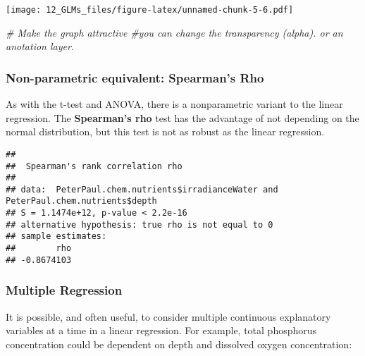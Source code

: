 \documentclass[]{article}
\newenvironment{Shaded}{\begin{snugshade}}{\end{snugshade}}
\newcommand{\KeywordTok}[1]{\textcolor[rgb]{0.13,0.29,0.53}{\textbf{#1}}}
\newcommand{\DataTypeTok}[1]{\textcolor[rgb]{0.13,0.29,0.53}{#1}}
\newcommand{\StringTok}[1]{\textcolor[rgb]{0.31,0.60,0.02}{#1}}
\newcommand{\CommentTok}[1]{\textcolor[rgb]{0.56,0.35,0.01}{\textit{#1}}}
\newcommand{\OtherTok}[1]{\textcolor[rgb]{0.56,0.35,0.01}{#1}}
\newcommand{\OperatorTok}[1]{\textcolor[rgb]{0.81,0.36,0.00}{\textbf{#1}}}
\newcommand{\NormalTok}[1]{#1}
\begin{document}
\texttt{[image: 12\_GLMs\_files/figure-latex/unnamed-chunk-5-6.pdf]}

\begin{Shaded}
\begin{Highlighting}[]
\CommentTok{# Make the graph attractive}
\CommentTok{#you can change the transparency (alpha). or an anotation layer.}
\end{Highlighting}
\end{Shaded}

\subsubsection{Non-parametric equivalent: Spearman's
Rho}\label{non-parametric-equivalent-spearmans-rho}

As with the t-test and ANOVA, there is a nonparametric variant to the
linear regression. The \textbf{Spearman's rho} test has the advantage of
not depending on the normal distribution, but this test is not as robust
as the linear regression.

\begin{Shaded}
\end{Shaded}

\begin{verbatim}
## 
##  Spearman's rank correlation rho
## 
## data:  PeterPaul.chem.nutrients$irradianceWater and PeterPaul.chem.nutrients$depth
## S = 1.1474e+12, p-value < 2.2e-16
## alternative hypothesis: true rho is not equal to 0
## sample estimates:
##        rho 
## -0.8674103
\end{verbatim}

\subsubsection{Multiple Regression}\label{multiple-regression}

It is possible, and often useful, to consider multiple continuous
explanatory variables at a time in a linear regression. For example,
total phosphorus concentration could be dependent on depth and dissolved
oxygen concentration:
\end{document}
